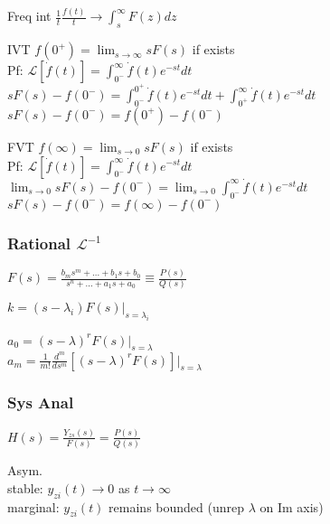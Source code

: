 \documentclass[4pt]{article}
\theoremstyle{definition}
\theoremstyle{definition}
\newcommand{\ulint}{\int_{0^-}^{\infty}}    %
\newcommand{\ra}{\rightarrow}
\begin{document}
    Freq int \(\frac{1}{t}\frac{f(t)}{t} \ra \int_s^{\infty}F(z) dz\)

    IVT \(f(0^+) = \lim_{s\ra \infty} sF(s)\) if exists\\
        Pf: \(\mathcal L[\dot{f} (t)] = \ulint \dot f(t) e^{-st} dt\)\\ %
        \(sF(s) - f(0^-) = \int_{0^-}^{0^+} \dot f (t) e^{-st} dt + \int _{0^+}^{\infty} \dot f(t) e^{-st} dt \)\\    %
        \(sF(s) - f(0^-) = f(0^+) - f(0^-)\)    %

    FVT \(f(\infty) = \lim_{s\ra 0} sF(s)\) if exists\\
        Pf: \(\mathcal L[\dot{f} (t)] = \ulint \dot f(t) e^{-st} dt\)\\ %
        \(\lim_{s\ra 0} sF(s) - f(0^-) = \lim_{s\ra 0}\ulint \dot f (t) e^{-st} dt\)\\    %
        \(sF(s) - f(0^-) = f(\infty) - f(0^-)\)    %


\subsubsection{Rational $\mathcal L^{-1}$}
    \(F(s) = \frac{b_ms^m + ... + b_1s + b_0}{s^n + ... + a_1s + a_0} \equiv \frac{P(s)}{Q(s)}\)

    \(k = (s-\lambda_i) F(s) | _{s = \lambda_i}\)

    \(a_0 = (s-\lambda)^r F(s)|_{s=\lambda}\)\\
    \(a_m = \frac{1}{m!} \frac{d^m}{ds^m}[(s-\lambda)^r F(s)] |_{s = \lambda}\)

\subsubsection{Sys Anal}
    $H(s) = \frac{Y_{zs}(s)}{F(s)} = \frac{P(s)}{Q(s)}$  %

    Asym.\\
    stable: $y_{zi}(t) \ra 0$ as $t\ra \infty$\\
    marginal: $y_{zi}(t)$ remains bounded (unrep $\lambda$ on Im axis)
\end{document}
